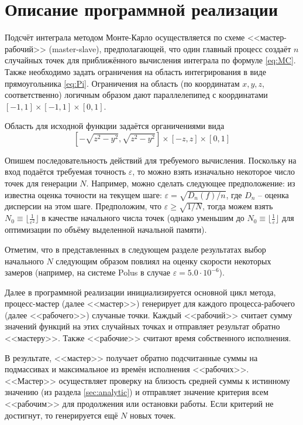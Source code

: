 \documentclass[12pt, fleqn]{article}
\theoremstyle{definition}
\begin{document}
\section{Описание программной реализации}
Подсчёт интеграла методом Монте-Карло осуществляется по схеме <<мастер-рабочий>> (master-slave), предполагающей, что один главный процесс создаёт $n$ случайных точек для приближённого вычисления интеграла по формуле \ref{eq:MC}.
Также необходимо задать ограничения на область интегрирования в виде прямоугольника \ref{eq:Pi}. Ограничения на область (по координатам $x, y, z$, соответственно) логичным образом дают параллелепипед с координатами $[-1, 1]\times[-1, 1]\times[0, 1]$.

Область для исходной функции задаётся органичениями вида 
\abovedisplayskip=0pt
\noindent
$$[-\sqrt{z^2 - y^2}, \sqrt{z^2 - y^2}] \times [-z, z] \times [0, 1]$$

Опишем последовательность действий для требуемого вычисления. Поскольку на вход подаётся требуемая точность $\varepsilon$, то можно взять изначально некоторое число точек для генерации $N$. Например, можно сделать следующее предположение: из \cite{Bahvalov97} известна оценка точности на текущем шаге: $\varepsilon = \sqrt{D_n(f)/n}$, где $D_n$ -- оценка дисперсии на этом шаге. Предположим, что $\varepsilon \geq \sqrt{1/N}$, тогда можем взять $N_0 \equiv \lfloor\frac{1}{\varepsilon^2}\rfloor$ в качестве начального числа точек (однако уменьшим до $N_0 \equiv \lfloor\frac{1}{\varepsilon}\rfloor$ для оптимизации по объёму выделенной начальной памяти).

Отметим, что в представленных в следующем разделе результатах выбор начального $N$ следующим образом повлиял на оценку скорости некоторых замеров (например, на системе Polus в случае $\varepsilon=5.0 \cdot 10^{-6}$). 

Далее в программной реализации инициализируется основной цикл метода, процесс-мастер (далее <<мастер>>) генерирует для каждого процесса-рабочего (далее <<рабочего>>) случаные точки. Каждый <<рабочий>> считает сумму значений функций на этих случайных точках и отправляет результат обратно <<мастеру>>. Также <<рабочие>> считают время собственного исполнения.

В результате, <<мастер>> получает обратно подсчитанные суммы на подмассивах и максимальное из времён исполнения <<рабочих>>. <<Мастер>> осуществляет проверку на близость средней суммы к истинному значению (из раздела \ref{sec:analytic}) и отправляет значение критерия всем <<рабочим>> для продолжения или остановки работы. Если критерий не достигнут, то генерируется ещё $N$ новых точек.
\end{document}

